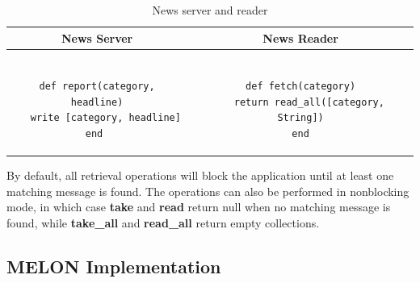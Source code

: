 \documentclass{llncs}
\begin{document}
\begin{table}
\centering
\caption{News server and reader}
\begin{tabular}{|c|c|} \hline
\textbf{News Server} & \textbf{News Reader} \\ \hline
\begin{minipage}{2.45in}
\begin{verbatim}

def report(category, headline)
   write [category, headline]
end 
\end{verbatim}
\end{minipage}
&
\begin{minipage}{2.5in}
\begin{verbatim}

def fetch(category)
   return read_all([category, String])
end
\end{verbatim}
\end{minipage}
\\ \hline
\end{tabular}
\label{fig:newsreader}
\end{table}

By default, all retrieval operations will block the application until at least one matching message is found. The operations can also be performed in nonblocking mode, in which case \textbf{take} and \textbf{read} return null when no matching message is found, while \textbf{take\_all} and \textbf{read\_all} return empty collections.
   
\subsection{MELON Implementation}\label{sec:implementation}
\end{document}
